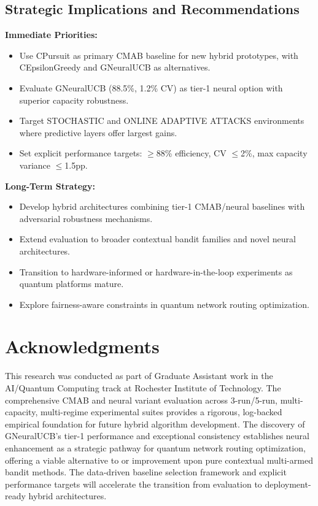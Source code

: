 \documentclass[12pt,a4paper]{article}
\begin{document}
\subsection{Strategic Implications and Recommendations}

\textbf{Immediate Priorities:}
\begin{itemize}
\item Use CPursuit as primary CMAB baseline for new hybrid prototypes, with CEpsilonGreedy and GNeuralUCB as alternatives.
\item Evaluate GNeuralUCB (88.5\%, 1.2\% CV) as tier-1 neural option with superior capacity robustness.
\item Target STOCHASTIC and ONLINE ADAPTIVE ATTACKS environments where predictive layers offer largest gains.
\item Set explicit performance targets: $\geq$88\% efficiency, CV $\leq$2\%, max capacity variance $\leq$1.5pp.
\end{itemize}

\textbf{Long-Term Strategy:}
\begin{itemize}
\item Develop hybrid architectures combining tier-1 CMAB/neural baselines with adversarial robustness mechanisms.
\item Extend evaluation to broader contextual bandit families and novel neural architectures.
\item Transition to hardware-informed or hardware-in-the-loop experiments as quantum platforms mature.
\item Explore fairness-aware constraints in quantum network routing optimization.
\end{itemize}

\section{Acknowledgments}

This research was conducted as part of Graduate Assistant work in the AI/Quantum Computing track at Rochester Institute of Technology. The comprehensive CMAB and neural variant evaluation across 3-run/5-run, multi-capacity, multi-regime experimental suites provides a rigorous, log-backed empirical foundation for future hybrid algorithm development. The discovery of GNeuralUCB's tier-1 performance and exceptional consistency establishes neural enhancement as a strategic pathway for quantum network routing optimization, offering a viable alternative to or improvement upon pure contextual multi-armed bandit methods. The data-driven baseline selection framework and explicit performance targets will accelerate the transition from evaluation to deployment-ready hybrid architectures.
\end{document}
